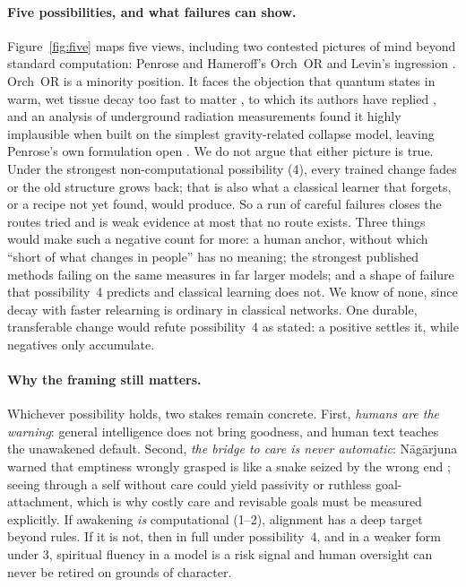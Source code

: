\documentclass[11pt]{article}
\begin{document}
\paragraph{Five possibilities, and what failures can show.} Figure~\ref{fig:five} maps five views, including two contested pictures of mind beyond standard computation: Penrose and Hameroff's Orch~OR \citep{penrose1994shadows,hameroff2014orchor} and Levin's ingression \citep{levin2025ingressing}. Orch~OR is a minority position. It faces the objection that quantum states in warm, wet tissue decay too fast to matter \citep{tegmark2000decoherence}, to which its authors have replied \citep{hagan2002decoherence}, and an analysis of underground radiation measurements found it highly implausible when built on the simplest gravity-related collapse model, leaving Penrose's own formulation open \citep{derakhshani2022crossroad}. We do not argue that either picture is true. Under the strongest non-computational possibility (4), every trained change fades or the old structure grows back; that is also what a classical learner that forgets, or a recipe not yet found, would produce. So a run of careful failures closes the routes tried and is weak evidence at most that no route exists. Three things would make such a negative count for more: a human anchor, without which ``short of what changes in people'' has no meaning; the strongest published methods failing on the same measures in far larger models; and a shape of failure that possibility~4 predicts and classical learning does not. We know of none, since decay with faster relearning is ordinary in classical networks. One durable, transferable change would refute possibility~4 as stated: a positive settles it, while negatives only accumulate.

\paragraph{Why the framing still matters.} Whichever possibility holds, two stakes remain concrete. First, \emph{humans are the warning}: general intelligence does not bring goodness, and human text teaches the unawakened default. Second, \emph{the bridge to care is never automatic}: N\=ag\=arjuna warned that emptiness wrongly grasped is like a snake seized by the wrong end \citep{nagarjuna_mmk}; seeing through a self without care could yield passivity or ruthless goal-attachment, which is why costly care and revisable goals must be measured explicitly. If awakening \emph{is} computational (1--2), alignment has a deep target beyond rules. If it is not, then in full under possibility~4, and in a weaker form under 3, spiritual fluency in a model is a risk signal and human oversight can never be retired on grounds of character.
\end{document}
